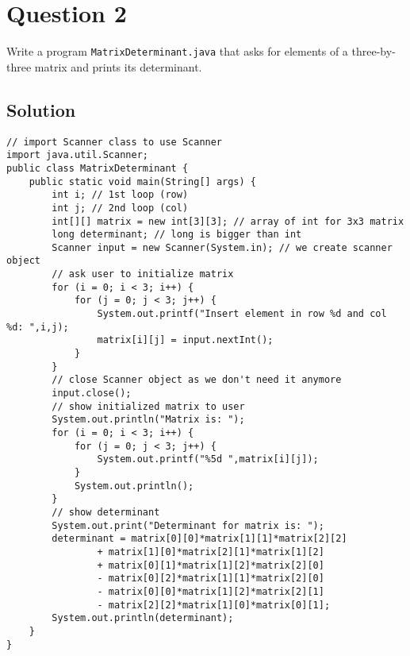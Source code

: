 \documentclass[12pt,letterpaper,twoside]{article}
\begin{document}
\section*{Question 2}

Write a program \texttt{MatrixDeterminant.java} that asks for elements of a three-by-three matrix and prints its determinant.

\subsection*{Solution}

\lstset{language=Java,tabsize=2}
\begin{lstlisting}
// import Scanner class to use Scanner
import java.util.Scanner;
public class MatrixDeterminant {
	public static void main(String[] args) {
		int i; // 1st loop (row)
		int j; // 2nd loop (col)
		int[][] matrix = new int[3][3]; // array of int for 3x3 matrix
		long determinant; // long is bigger than int
		Scanner input = new Scanner(System.in); // we create scanner object
		// ask user to initialize matrix
		for (i = 0; i < 3; i++) {
			for (j = 0; j < 3; j++) {
				System.out.printf("Insert element in row %d and col %d: ",i,j);
				matrix[i][j] = input.nextInt();
			}
		}
		// close Scanner object as we don't need it anymore
		input.close();
		// show initialized matrix to user
		System.out.println("Matrix is: ");
		for (i = 0; i < 3; i++) {
			for (j = 0; j < 3; j++) {
				System.out.printf("%5d ",matrix[i][j]);
			}
			System.out.println();
		}
		// show determinant
		System.out.print("Determinant for matrix is: ");
		determinant = matrix[0][0]*matrix[1][1]*matrix[2][2]
				+ matrix[1][0]*matrix[2][1]*matrix[1][2]
				+ matrix[0][1]*matrix[1][2]*matrix[2][0]
				- matrix[0][2]*matrix[1][1]*matrix[2][0]
				- matrix[0][0]*matrix[1][2]*matrix[2][1]
				- matrix[2][2]*matrix[1][0]*matrix[0][1];
		System.out.println(determinant);
	}
}
\end{lstlisting}
\end{document}
